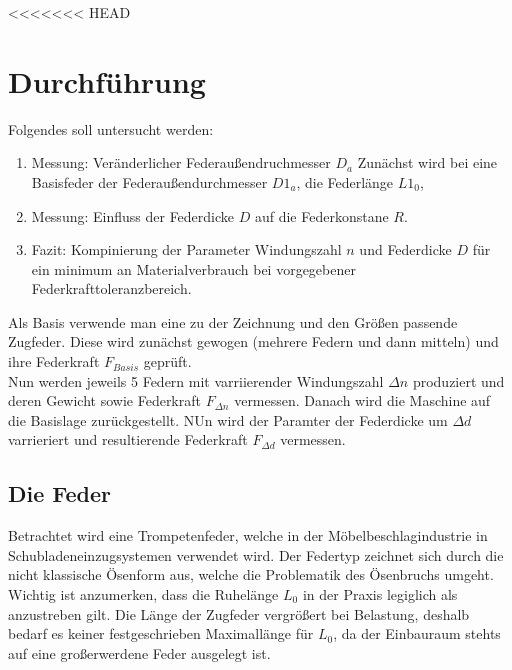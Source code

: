 <<<<<<< HEAD
\section{Durchführung}
\label{sec:Durchfuehrung}
Folgendes soll untersucht werden:
\begin{enumerate}
    \item Messung: Veränderlicher Federaußendruchmesser $D_a$
    Zunächst wird bei eine Basisfeder der Federaußendurchmesser $D1_a$, die
    Federlänge $L1_0$, 

    \item Messung: Einfluss der Federdicke $D$ auf die Federkonstane $R$.
    \item Fazit: Kompinierung der Parameter Windungszahl $n$ und Federdicke $D$ für ein minimum
    an Materialverbrauch bei vorgegebener Federkrafttoleranzbereich.
\end{enumerate}
Als Basis verwende man eine zu der Zeichnung und den Größen passende Zugfeder. Diese
wird zunächst gewogen (mehrere Federn und dann mitteln) und ihre Federkraft $F_{Basis}$
geprüft.\\
Nun werden jeweils 5 Federn mit varriierender Windungszahl $\Delta n$ produziert und deren
Gewicht sowie Federkraft $F_{\Delta n}$ vermessen.
Danach wird die Maschine auf die Basislage zurückgestellt. NUn wird der Paramter 
der Federdicke um $\Delta d$ varrieriert und resultierende Federkraft $F_{\Delta d}$
vermessen.  


\subsection{Die Feder}
Betrachtet wird eine Trompetenfeder, welche in der Möbelbeschlagindustrie in Schubladeneinzugsystemen
verwendet wird. 
Der Federtyp zeichnet sich durch die nicht klassische Ösenform aus, welche die Problematik des Ösenbruchs umgeht.\\

Wichtig ist anzumerken, dass die Ruhelänge $L_0$ in der Praxis legiglich als anzustreben gilt.
Die Länge der Zugfeder vergrößert bei Belastung, deshalb bedarf es keiner festgeschrieben Maximallänge für $L_0$, da
der Einbauraum stehts auf eine großerwerdene Feder ausgelegt ist.  
\newline

